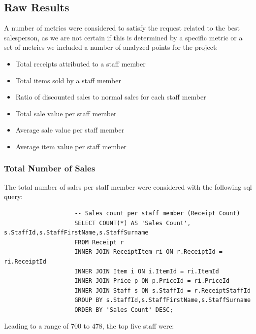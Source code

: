 \documentclass{article}
\begin{document}
            \subsection{Raw Results}
            A number of metrics were considered to satisfy the request related to the best salesperson,
            as we are not certain if this is determined by a specific metric or a set of metrics we 
            included a number of analyzed points for the project:
            \begin{itemize}
                \item Total receipts attributed to a staff member
                \item Total items sold by a staff member
                \item Ratio of discounted sales to normal sales for each staff member
                \item Total sale value per staff member
                \item Average sale value per staff member
                \item Average item value per staff member
            \end{itemize}

                \newpage

            \subsubsection{Total Number of Sales}
                The total number of sales per staff member were considered with the following 
                sql query:
                \begin{lstlisting}
                    -- Sales count per staff member (Receipt Count)
                    SELECT COUNT(*) AS 'Sales Count', s.StaffId,s.StaffFirstName,s.StaffSurname
                    FROM Receipt r
                    INNER JOIN ReceiptItem ri ON r.ReceiptId = ri.ReceiptId
                    INNER JOIN Item i ON i.ItemId = ri.ItemId
                    INNER JOIN Price p ON p.PriceId = ri.PriceId
                    INNER JOIN Staff s ON s.StaffId = r.ReceiptStaffId
                    GROUP BY s.StaffId,s.StaffFirstName,s.StaffSurname
                    ORDER BY 'Sales Count' DESC;
                \end{lstlisting}

                Leading to a range of 700 to 478, the top five staff were:
\end{document}
